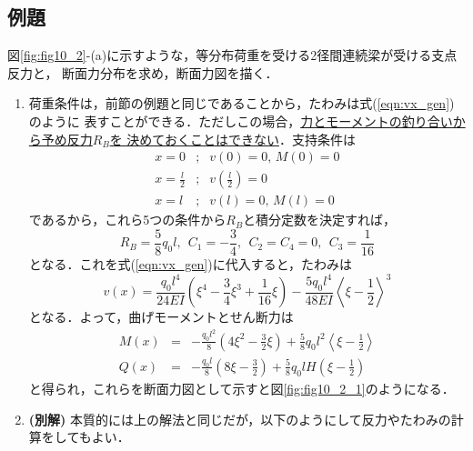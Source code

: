 \documentclass[10pt,a4j]{jarticle}
\begin{document}
\subsection{例題}
図\ref{fig:fig10_2}-(a)に示すような，等分布荷重を受ける2径間連続梁が受ける支点反力と，
断面力分布を求め，断面力図を描く．
\begin{enumerate}
\item
荷重条件は，前節の例題と同じであることから，たわみは式(\ref{eqn:vx_gen})のように
表すことができる．ただしこの場合，\underline{力とモーメントの釣り合いから予め反力$R_B$を
決めておくことはできない}．支持条件は
\begin{eqnarray}
	x=0 &;& v(0)=0, \, M(0)=0 
	\label{eqn:BC_0}
	\\
	x=\frac{l}{2} &;& v\left( \frac{l}{2} \right)=0
	\label{eqn:BC_l2}
	\\
	x=l &;& v(l)=0, \, M(l)=0
	\label{eqn:BC_l}
\end{eqnarray}
であるから，これら5つの条件から$R_B$と積分定数を決定すれば，
\begin{equation}
	R_B=\frac{5}{8}q_0l, \ \ C_1=-\frac{3}{4}, \ \ C_2=C_4=0, \ \ C_3=\frac{1}{16}
\end{equation}
となる．これを式(\ref{eqn:vx_gen})に代入すると，たわみは
\begin{equation}
	v(x)=\frac{q_0l^4}{24EI}\left( \xi^4-\frac{3}{4}\xi^3 +\frac{1}{16}\xi \right)
	-
	\frac{5q_0l^4}{48EI}\left< \xi-\frac{1}{2}\right>^3
\end{equation}
となる．よって，曲げモーメントとせん断力は
\begin{eqnarray}
	M(x) &= & 
		-\frac{q_0l^2}{8}\left(4\xi^2 -\frac{3}{2}\xi \right)
		+
		\frac{5}{8}q_0l^2\left< \xi-\frac{1}{2}\right>
	\\
	Q(x) &= & 
		-\frac{q_0l}{8}\left(8\xi -\frac{3}{2} \right)
		+
		\frac{5}{8}q_0lH\left( \xi-\frac{1}{2}\right)
\end{eqnarray}
と得られ，これらを断面力図として示すと図\ref{fig:fig10_2_1}のようになる．
\item
{\bf (別解)}
本質的には上の解法と同じだが，以下のようにして反力やたわみの計算をしてもよい．


\end{enumerate}
\end{document}
